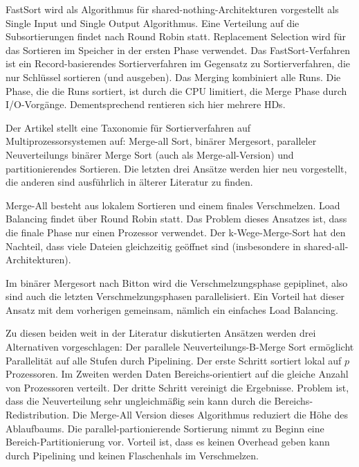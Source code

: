 \documentclass[a4paper,12pt,twoside]{article}
\begin{document}
\textbf{}

FastSort wird als Algorithmus für shared-nothing-Architekturen vorgestellt als Single Input und Single Output Algorithmus. Eine Verteilung auf die Subsortierungen findet nach Round Robin statt. Replacement Selection wird für das Sortieren im Speicher in der ersten Phase verwendet. Das FastSort-Verfahren ist ein Record-basierendes Sortierverfahren im Gegensatz zu Sortierverfahren, die nur Schlüssel sortieren (und ausgeben). Das Merging kombiniert alle Runs. Die Phase, die die Runs sortiert, ist durch die CPU limitiert, die Merge Phase durch I/O-Vorgänge. Dementsprechend rentieren sich hier mehrere HDs. 

\textbf{}

Der Artikel stellt eine Taxonomie für Sortierverfahren auf Multiprozessorsystemen auf: Merge-all Sort, binärer Mergesort, paralleler Neuverteilungs binärer Merge Sort (auch als Merge-all-Version) und partitionierendes Sortieren. Die letzten drei Ansätze werden hier neu vorgestellt, die anderen sind ausführlich in älterer Literatur zu finden.

Merge-All besteht aus lokalem Sortieren und einem finales Verschmelzen. Load Balancing findet über Round Robin statt. Das Problem dieses Ansatzes ist, dass die finale Phase nur einen Prozessor verwendet. Der k-Wege-Merge-Sort hat den Nachteil, dass viele Dateien gleichzeitig geöffnet sind (insbesondere in shared-all-Architekturen).

Im binärer Mergesort nach Bitton wird die Verschmelzungsphase gepiplinet, also sind auch die letzten Verschmelzungsphasen parallelisiert. Ein Vorteil hat dieser Ansatz mit dem vorherigen gemeinsam, nämlich ein einfaches Load Balancing.

Zu diesen beiden weit in der Literatur diskutierten Ansätzen werden drei Alternativen vorgeschlagen: Der parallele Neuverteilungs-B-Merge Sort ermöglicht Parallelität auf alle Stufen durch Pipelining. Der erste Schritt sortiert lokal auf $p$ Prozessoren. Im Zweiten werden Daten Bereichs-orientiert auf die gleiche Anzahl von Prozessoren verteilt. Der dritte Schritt vereinigt die Ergebnisse. Problem ist, dass die Neuverteilung sehr ungleichmäßig sein kann durch die Bereichs-Redistribution. Die Merge-All Version dieses Algorithmus reduziert die Höhe des Ablaufbaums. Die parallel-partionierende Sortierung nimmt zu Beginn eine Bereich-Partitionierung vor. Vorteil ist, dass es keinen Overhead geben kann durch Pipelining und keinen Flaschenhals im Verschmelzen.
\end{document}
